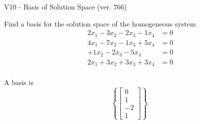 \begin{exercise}
  \begin{exerciseTitle}V10 - Basis of Solution Space (ver. 766)\end{exerciseTitle}
  \begin{exerciseStatement}
    Find a basis for the solution space of the homogeneous system 
\begin{align*}
 2 x_ 1 -3 x_ 2 -2 x_ 3 -1 x_ 4 &= 0  \\ 
  4 x_ 1 -7 x_ 2 -1 x_ 3 + 5 x_ 4 &= 0  \\ 
  + 1 x_ 2 -2 x_ 3 -5 x_ 4 &= 0  \\ 
  2 x_ 1 + 3 x_ 2 + 3 x_ 3 + 3 x_ 4 &= 0  \\ 
 \end{align*}


 
  \end{exerciseStatement}

  \begin{exerciseAnswer}
   A basis is   
\[\left\{\left[\begin{array}{c}
0 \\
1 \\
-2 \\
1
\end{array}\right]\right\}.\]

  


  \end{exerciseAnswer}
\end{exercise}